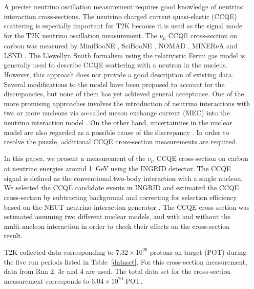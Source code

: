 \documentclass[%
 reprint,
superscriptaddress,
 amsmath,amssymb,
 aps,
]{revtex4-1}
\begin{document}
A precise neutrino oscillation measurement requires good knowledge of neutrino interaction cross-sections.
The neutrino charged current quasi-elastic (CCQE) scattering is especially important for T2K because it is used as the signal mode for the T2K neutrino oscillation measurement.
The $\nu_\mu$ CCQE cross-section on carbon was measured by MiniBooNE \cite{miniboone_ccqe}, SciBooNE \cite{sciboone_ccqe}, NOMAD \cite{nomad_ccqe}, MINER$\nu$A \cite{minerva_ccqe_nu} and LSND \cite{lsnd_ccqe}.
The Llewellyn Smith formalism \cite{smith} using the relativistic Fermi gas model \cite{moniz} is generally used to describe CCQE scattering with a neutron in the nucleus.
However, this approach does not provide a good description of 
existing data.  Several modifications to the model have been 
proposed to account for the discrepancies, but none of them has yet achieved general acceptance.
One of the more promising approaches involves the introduction of neutrino interactions with two or more nucleons via so-called meson exchange current (MEC) into the neutrino interaction model \cite{mec_martini1, mec_martini2, mec_nieves1, mec_nieves2, mec_bodek, mec_lalakulich, mec_amaro}.
On the other hand, uncertainties in the nuclear model are also regarded as a possible cause of the discrepancy \cite{ankowski}.
In order to resolve the puzzle, additional CCQE cross-section measurements are required.

In this paper, we present a measurement of the $\nu_\mu$ CCQE cross-section on carbon at neutrino energies around 1~GeV using the INGRID detector.
The CCQE signal is defined as the conventional two-body interaction with a single nucleon.
We selected the CCQE candidate events in INGRID and estimated the CCQE cross-section by subtracting background and correcting for selection efficiency based on the NEUT neutrino interaction generator \cite{neut_hayato}.
The CCQE cross-section was estimated assuming two different nuclear models, and with and without the multi-nucleon interaction in order to check their effects on the cross-section result.

T2K collected data corresponding to $7.32\times10^{20}$ protons on target (POT) during the five run periods listed in Table~\ref{dataset}.
For this cross-section measurement, data from Run 2, 3c and 4 are used.
The total data set for the cross-section measurement corresponds to $6.04\times10^{20}$ POT.
\end{document}
